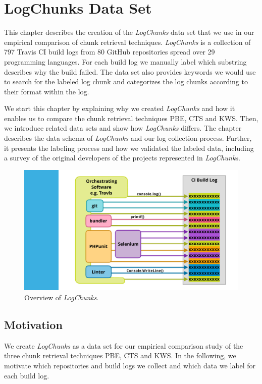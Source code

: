 \documentclass[\myrootdir/main.tex]{subfiles}
\begin{document}
\chapter{LogChunks Data Set}
\label{sec:data-set}

This chapter describes the creation of the \emph{LogChunks} data set that we use in our empirical comparison of chunk retrieval techniques.
\emph{LogChunks} is a collection of 797 Travis CI build logs from 80 GitHub repositories spread over 29 programming languages.
For each build log we manually label which substring describes why the build failed.
The data set also provides keywords we would use to search for the labeled log chunk and categorizes the log chunks according to their format within the log.

We start this chapter by explaining why we created \emph{LogChunks} and how it enables us to compare the chunk retrieval techniques PBE, CTS and KWS\@.
Then, we introduce related data sets and show how \emph{LogChunks} differs.
The chapter describes the data schema of \emph{LogChunks} and our log collection process.
Further, it presents the labeling process and how we validated the labeled data, including a survey of the original developers of the projects represented in \emph{LogChunks}.

\begin{figure}[htbp]
	\centering
	\includegraphics[page=3, width=\textwidth, trim={2cm 2cm 2cm 0.5cm}, clip]{img/overview-graphics.pdf}
	\caption{Overview of \emph{LogChunks}.}
	\label{fig:lc-overview}
\end{figure}

\section{Motivation}
We create \emph{LogChunks} as a data set for our empirical comparison study of the three chunk retrieval techniques PBE, CTS and KWS\@.
In the following, we motivate which repositories and build logs we collect and which data we label for each build log.
\end{document}
